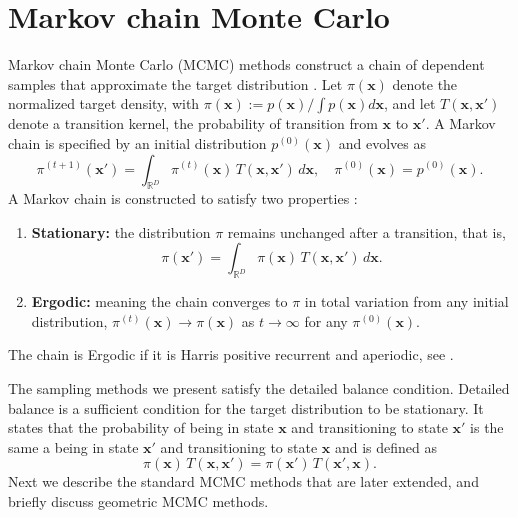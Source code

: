 \section{Markov chain Monte Carlo} \label{sec:mcmc}
Markov chain Monte Carlo (MCMC) methods construct a chain of dependent samples that approximate the target distribution \citep{robert2004monte}.
 Let $\pi(\boldsymbol{x})$ denote the normalized target density, with $\pi(\boldsymbol{x}) :=  p(\boldsymbol{x})/\int p(\boldsymbol{x}) d\boldsymbol{x}$, and let $T(\boldsymbol{x},\boldsymbol{x}')$ denote a transition kernel, the probability of transition from $\boldsymbol{x}$ to $\boldsymbol{x}'$.
A Markov chain is specified by an initial distribution $p^{(0)}(\boldsymbol{x})$ and evolves as
\begin{equation*}
    \pi^{(t+1)}(\boldsymbol{x}')
    = \int_{\mathbb{R}^D} \pi^{(t)}(\boldsymbol{x})\,T(\boldsymbol{x},\boldsymbol{x}')\,d\boldsymbol{x}, \quad \pi^{(0)}(\boldsymbol{x})=p^{(0)}(\boldsymbol{x}).
\end{equation*}
A Markov chain is constructed to satisfy two properties \citep{mackay2003information}:
\begin{enumerate}
    \item \textbf{Stationary:}  the distribution $\pi$  remains unchanged after a transition, that is,
    \begin{equation*}
    \pi(\boldsymbol{x}')
    = \int_{\mathbb{R}^D}\pi(\boldsymbol{x})\,T(\boldsymbol{x},\boldsymbol{x}')\,d\boldsymbol{x}.    
    \end{equation*}    
    \item \textbf{Ergodic:} meaning the chain converges to $\pi$ in total variation from any initial distribution, $\pi^{(t)}(\boldsymbol{x})\to \pi(\boldsymbol{x})$ as $t\to\infty$ for any $\pi^{(0)}(\boldsymbol{x})$.
\end{enumerate}
The chain is Ergodic if it is Harris positive recurrent and aperiodic, see \citet[Chapter~7]{meyn2012markov}.

The sampling methods we present satisfy the detailed balance condition. Detailed balance is a sufficient condition for the target distribution to be stationary. It states that the probability of being in state $\boldsymbol{x}$ and transitioning to state $\boldsymbol{x}'$ is the same a being in state $\boldsymbol{x}'$ and transitioning to state $\boldsymbol{x}$ and is defined as
\begin{equation*}
    \pi(\boldsymbol{x})\,T(\boldsymbol{x},\boldsymbol{x}')
    =
    \pi(\boldsymbol{x}')\,T(\boldsymbol{x}',\boldsymbol{x}).
\end{equation*}
Next we describe the standard MCMC methods that are later extended, and briefly discuss geometric MCMC methods.


